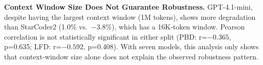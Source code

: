 \documentclass[lettersize,journal]{IEEEtran}
\begin{document}
\textbf{Context Window Size Does Not Guarantee Robustness.} GPT-4.1-mini, despite having the largest context window (1M tokens), shows more degradation than StarCoder2 (1.0\% vs.\ $-3.8\%$), which has a 16K-token window. Pearson correlation is not statistically significant in either split (PBD: r=$-0.365$, p=0.635; LFD: r=$-0.592$, p=0.408). With seven models, this analysis only shows that context-window size alone does not explain the observed robustness pattern.


\end{document}
